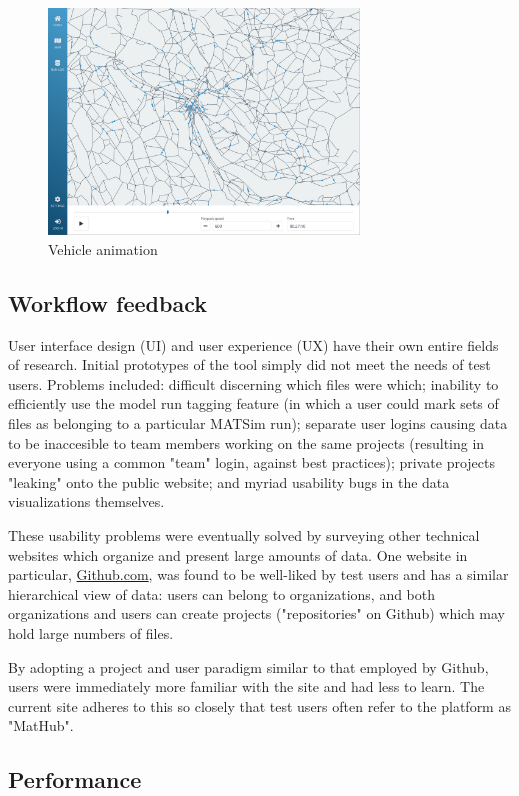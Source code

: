 \documentclass[Afour,sagev,times]{sagej}
\begin{document}
\begin{figure}
\centering
\includegraphics[width=3.25in]{fig-animation.png}
\caption{Vehicle animation}\label{Fanim}
\end{figure}

\subsection{Workflow feedback}

User interface design (UI) and user experience (UX) have their own entire fields of research. Initial prototypes of the tool simply did not meet the needs of test users. Problems included: difficult discerning which files were which; inability to efficiently use the model run tagging feature (in which a user could mark sets of files as belonging to a particular MATSim run); separate user logins causing data to be inaccesible to team members working on the same projects (resulting in everyone using a common "team" login, against best practices); private projects "leaking" onto the public website; and myriad usability bugs in the data visualizations themselves.

These usability problems were eventually solved by surveying other technical websites which organize and present large amounts of data. One website in particular, \url{Github.com}, was found to be well-liked by test users and has a similar hierarchical view of data: users can belong to organizations, and both organizations and users can create projects ("repositories" on Github) which may hold large numbers of files.

By adopting a project and user paradigm similar to that employed by Github, users were immediately more familiar with the site and had less to learn. The current site adheres to this so closely that test users often refer to the platform as "MatHub".

\subsection{Performance}
\end{document}
